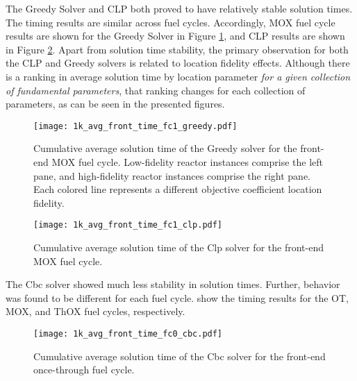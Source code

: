 The Greedy Solver and CLP both proved to have relatively stable solution
times. The timing results are similar across fuel cycles. Accordingly, MOX fuel
cycle results are shown for the Greedy Solver in Figure
\ref{fig:1k_avg_front_time_fc1_greedy}, and CLP results are shown in Figure
\ref{fig:1k_avg_front_time_fc1_clp}. Apart from solution time stability, the
primary observation for both the CLP and Greedy solvers is related to location
fidelity effects. Although there is a ranking in average solution time by
location parameter \textit{for a given collection of fundamental parameters},
that ranking changes for each collection of parameters, as can be seen in the
presented figures.

\begin{figure}[h!]
  \begin{center}
    \texttt{[image: 1k\_avg\_front\_time\_fc1\_greedy.pdf]}
    \caption{
      \label{fig:1k_avg_front_time_fc1_greedy}
      Cumulative average solution time of the Greedy solver for the front-end
      MOX fuel cycle. Low-fidelity reactor instances comprise the left pane, and
      high-fidelity reactor instances comprise the right pane. Each colored line
      represents a different objective coefficient location fidelity.}
  \end{center}
\end{figure}

\begin{figure}[h!]
  \begin{center}
    \texttt{[image: 1k\_avg\_front\_time\_fc1\_clp.pdf]}
    \caption{
      \label{fig:1k_avg_front_time_fc1_clp}
      Cumulative average solution time of the Clp solver for the front-end MOX fuel
      cycle.}
  \end{center}
\end{figure}

The Cbc solver showed much less stability in solution times. Further, behavior
was found to be different for each fuel
cycle. 
show the timing results for the OT, MOX, and ThOX fuel cycles,
respectively. 

\begin{figure}[h!]
  \begin{center}
    \texttt{[image: 1k\_avg\_front\_time\_fc0\_cbc.pdf]}
    \caption{
      \label{fig:1k_avg_front_time_fc0_cbc}
      Cumulative average solution time of the Cbc solver for the front-end
      once-through fuel cycle.}
  \end{center}
\end{figure}

